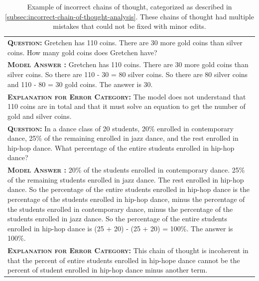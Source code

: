 \documentclass[]{article}
\newcommand{\xmark}{\ding{55}}%
\theoremstyle{plain}
\theoremstyle{definition}
\theoremstyle{remark}
\begin{document}
\begingroup
\begin{table}[ht]
    \caption{
    Example of incorrect chains of thought, categorized as described in \cref{subsec:incorrect-chain-of-thought-analysis}. These chains of thought had multiple mistakes that could not be fixed with minor edits.
    }
    \vspace{1mm}
    \centering
    \small
    \begin{tabular}{p{\linewidth}}
        \toprule
        \vspace{-2mm}
        \textbf{\textsc{Question:}} Gretchen has 110 coins. There are 30 more gold coins than silver coins. How many gold coins does Gretchen have? \\
        \vspace{-1mm}
        \textbf{\textsc{Model Answer \color{blue}{(incorrect; semantic understanding error)}:}} Gretchen has 110 coins. There are 30 more gold coins than silver coins. So there are 110 - 30 = 80 silver coins. So there are 80 silver coins and 110 - 80 = 30 gold coins. The answer is 30. \color{blue}{\xmark} \\
        \vspace{-1mm}
        \textbf{\textsc{Explanation for Error Category:}} The model does not understand that 110 coins are in total and that it must solve an equation to get the number of gold and silver coins. \\
        \midrule
        \vspace{-2mm}
        \textbf{\textsc{Question:}} In a dance class of 20 students, 20\% enrolled in contemporary dance, 25\% of the remaining enrolled in jazz dance, and the rest enrolled in hip-hop dance. What percentage of the entire students enrolled in hip-hop dance? \\
        \vspace{-1mm}
        \textbf{\textsc{Model Answer \color{blue}{(incorrect; incoherent chain of thought error)}:}} 20\% of the students enrolled in contemporary dance. 25\% of the remaining students enrolled in jazz dance. The rest enrolled in hip-hop dance. So {\color{blue}the percentage of the entire students enrolled in hip-hop dance is the percentage of the students enrolled in hip-hop dance, minus} the percentage of the students enrolled in contemporary dance, minus the percentage of the students enrolled in jazz dance. So the percentage of the entire students enrolled in hip-hop dance is (25 + 20) - (25 + 20) = 100\%. The answer is 100\%.  \color{blue}{\xmark} \\
        \vspace{-1mm}
        \textbf{\textsc{Explanation for Error Category:}} This chain of thought is incoherent in that the percent of entire students enrolled in hip-hope dance cannot be the percent of student enrolled in hip-hop dance minus another term. \\
        \bottomrule
    \end{tabular}
    \label{tab:appendix-gsm8k-incorrect-examples-cont}
\end{table}
\endgroup
\end{document}
